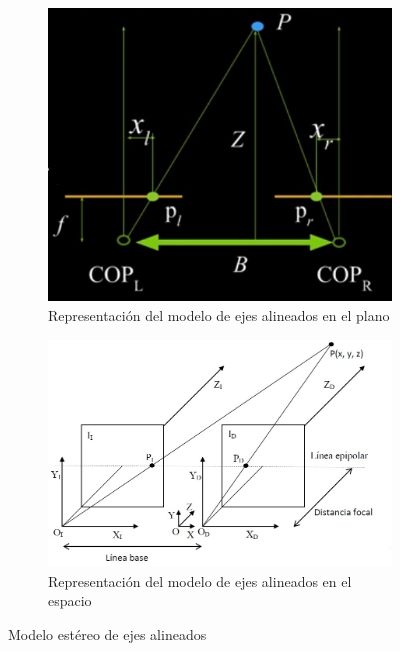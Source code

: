 \begin{figure}[H]
     \centering
     \begin{subfigure}[b]{0.4\textwidth}
        \centering
        \includegraphics[scale=0.5]{Recursos/stereoGeometry.jpg}
        \caption{Representación del modelo de ejes alineados en el plano}
        \label{estereoSystemParallel}
     \end{subfigure}
     \hfill
     \begin{subfigure}[b]{0.4\textwidth}
         \centering
        \includegraphics[scale=0.3]{Recursos/stereoGeometry3D.jpg}
        \caption{Representación del modelo de ejes alineados en el espacio}
        \label{estereoSystemParallel3D}
     \end{subfigure}
     \hfill
\caption{Modelo estéreo de ejes alineados}
\label{stereoMODEL}
\end{figure}
